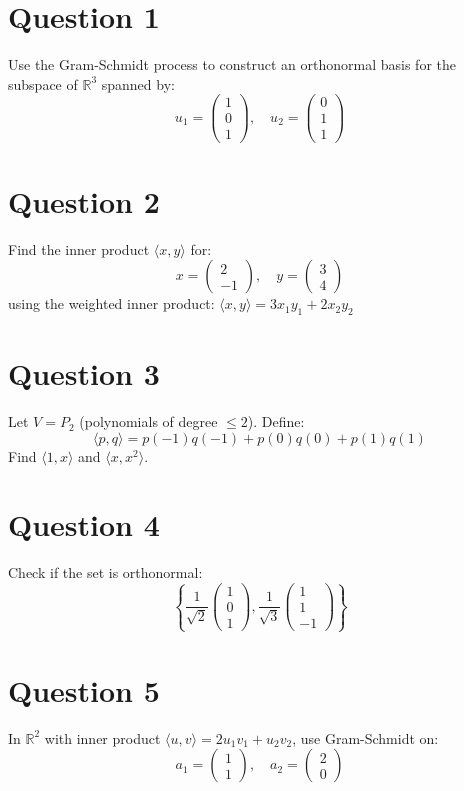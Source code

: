 \documentclass[12pt]{article}
\begin{document}
\section*{Question 1}
Use the Gram-Schmidt process to construct an orthonormal basis for the subspace of $\mathbb{R}^3$ spanned by:
\[
u_1 = \begin{pmatrix} 1 \\ 0 \\ 1 \end{pmatrix}, \quad u_2 = \begin{pmatrix} 0 \\ 1 \\ 1 \end{pmatrix}
\]



\section*{Question 2}
Find the inner product $\langle x, y \rangle$ for:
\[
x = \begin{pmatrix} 2 \\ -1 \end{pmatrix}, \quad y = \begin{pmatrix} 3 \\ 4 \end{pmatrix}
\]
using the weighted inner product: $\langle x, y \rangle = 3x_1y_1 + 2x_2y_2$



\section*{Question 3}
Let $V = P_2$ (polynomials of degree $\le 2$). Define:
\[
\langle p, q \rangle = p(-1)q(-1) + p(0)q(0) + p(1)q(1)
\]
Find $\langle 1, x \rangle$ and $\langle x, x^2 \rangle$.



\section*{Question 4}
Check if the set is orthonormal:
\[
\left\{ \frac{1}{\sqrt{2}} \begin{pmatrix} 1 \\ 0 \\ 1 \end{pmatrix}, \frac{1}{\sqrt{3}} \begin{pmatrix} 1 \\ 1 \\ -1 \end{pmatrix} \right\}
\]



\section*{Question 5}
In $\mathbb{R}^2$ with inner product $\langle u, v \rangle = 2u_1v_1 + u_2v_2$, use Gram-Schmidt on:
\[
a_1 = \begin{pmatrix} 1 \\ 1 \end{pmatrix}, \quad a_2 = \begin{pmatrix} 2 \\ 0 \end{pmatrix}
\]


\end{document}
